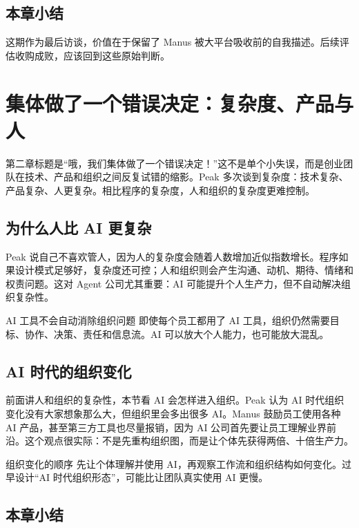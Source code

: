 \documentclass[a4paper]{article}
\begin{document}
\subsection{本章小结}

这期作为最后访谈，价值在于保留了 Manus 被大平台吸收前的自我描述。后续评估收购成败，应该回到这些原始判断。

\section{集体做了一个错误决定：复杂度、产品与人}

第二章标题是“哦，我们集体做了一个错误决定！”这不是单个小失误，而是创业团队在技术、产品和组织之间反复试错的缩影。Peak 多次谈到复杂度：技术复杂、产品复杂、人更复杂。相比程序的复杂度，人和组织的复杂度更难控制。

\subsection{为什么人比 AI 更复杂}

Peak 说自己不喜欢管人，因为人的复杂度会随着人数增加近似指数增长。程序如果设计模式足够好，复杂度还可控；人和组织则会产生沟通、动机、期待、情绪和权责问题。这对 Agent 公司尤其重要：AI 可能提升个人生产力，但不自动解决组织复杂性。

\begin{warningbox}{AI 工具不会自动消除组织问题}
即使每个员工都用了 AI 工具，组织仍然需要目标、协作、决策、责任和信息流。AI 可以放大个人能力，也可能放大混乱。
\end{warningbox}

\subsection{AI 时代的组织变化}

前面讲人和组织的复杂性，本节看 AI 会怎样进入组织。Peak 认为 AI 时代组织变化没有大家想象那么大，但组织里会多出很多 AI。Manus 鼓励员工使用各种 AI 产品，甚至第三方工具也尽量报销，因为 AI 公司首先要让员工理解业界前沿。这个观点很实际：不是先重构组织图，而是让个体先获得两倍、十倍生产力。

\begin{importantbox}{组织变化的顺序}
先让个体理解并使用 AI，再观察工作流和组织结构如何变化。过早设计“AI 时代组织形态”，可能比让团队真实使用 AI 更慢。
\end{importantbox}

\subsection{本章小结}
\end{document}
